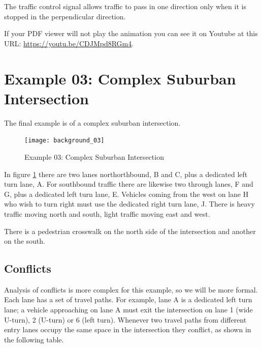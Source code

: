 \documentclass[letterpaper,twoside]{article}
\begin{document}
\noindent{}

The traffic control signal allows traffic to pass in one direction
only when it is stopped in the perpendicular direction.

If your PDF viewer will not play the animation you can see it on Youtube
at this URL:
\href{https://youtu.be/CDJMpd8RGm4}{https://youtu.be/CDJMpd8RGm4}.

\section{Example 03: Complex Suburban Intersection}

The final example is of a complex suburban intersection.
\begin{figure}[htb]
  {\texttt{[image: background\_03]}}
  {\caption{Example 03: Complex Suburban Intersection}
    \label{fig:complex_intersection}}
\end{figure}

In figure \ref{fig:complex_intersection} there are two lanes
northorthbound, B and C, plus a dedicated left turn lane, A.
For southbound traffic there are likewise two through lanes,
F and G, plus a dedicated left turn lane, E.
Vehicles coming from the west on lane H who wish to turn right
must use the dedicated right turn lane, J.
There is heavy traffic moving north and south,
light traffic moving east and west.

There is a pedestrian crosswalk on the north side of the intersection
and another on the south.

\subsection{Conflicts}

Analysis of conflicts is more complex for this example, so we
will be more formal.  Each lane has a set of travel paths.
For example, lane A is a dedicated left turn lane; a vehicle approaching on
lane A must exit the intersection on lane 1 (wide U-turn), 2 (U-turn)
or 6 (left turn).  Whenever two travel paths from different entry lanes
occupy the same space in the intersection they conflict,
as shown in the following table.
\end{document}
